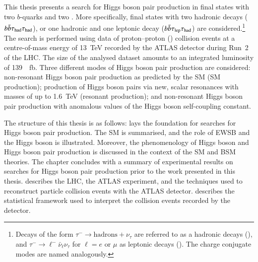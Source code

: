 This thesis presents a search for Higgs boson pair production in final states
with two $b$-quarks and two \tauleptons. More specifically, final states with
two hadronic \taulepton decays ($b\bar{b}\tau_{\text{had}}\tau_{\text{had}}$), or one hadronic and one
leptonic \taulepton decay ($b\bar{b}\tau_{\text{lep}}\tau_{\text{had}}$) are considered.\footnote{Decays of
  the form $\tau^- \to \text{hadrons} + \nu_\tau$ are referred to as a hadronic
  \taulepton decays (\tauhad), and $\tau^- \to \ell^- \bar{\nu}_\ell \nu_\tau$
  for $\ell = e$ or $\mu$ as leptonic \taulepton decays (\taulep). The charge
  conjugate modes are named analogously.} The search is performed using data of
proton--proton (\pp) collision events at a centre-of-mass energy of
\SI{13}{\TeV} recorded by the ATLAS detector during Run~2 of the LHC. The size
of the analysed dataset amounts to an integrated luminosity of
\SI{139}{\per\femto\barn}. Three different modes of Higgs boson pair production
are considered: non-resonant Higgs boson pair production as predicted by the SM
(SM \HH production); production of Higgs boson pairs via new, scalar resonances
with masses of up to \SI{1.6}{\TeV} (resonant \HH production); and non-resonant
Higgs boson pair production with anomalous values of the Higgs boson
self-coupling constant.

The structure of this thesis is as follows:  lays the
foundation for searches for Higgs boson pair production. The SM is summarised,
and the role of EWSB and the Higgs boson is illustrated. Moreover, the
phenomenology of Higgs boson and Higgs boson pair production is discussed in the
context of the SM and BSM theories. The chapter concludes with a summary of
experimental results on searches for Higgs boson pair production prior to the
work presented in this thesis.   describes the LHC, the
ATLAS experiment, and the techniques used to reconstruct particle collision
events with the ATLAS detector.  describes the
statistical framework used to interpret the collision events recorded by the
detector.

